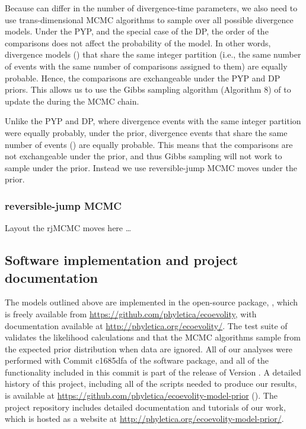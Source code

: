 \documentclass[letterpaper,12pt]{article}
\begin{document}
Because \etimesets can differ in the number of divergence-time parameters, we
also need to use trans-dimensional MCMC algorithms to sample over all possible
divergence models.
Under the PYP, and the special case of the DP, the order of the comparisons
does not affect the probability of the model.
In other words, divergence models (\etimesets) that share the same integer
partition (i.e., the same number of events with the same number of comparisons
assigned to them) are equally probable.
Hence, the comparisons are exchangeable under the PYP and DP priors.
This allows us to use the Gibbs sampling algorithm (Algorithm 8) of
\citet{Neal2000} to update the \etimesets during the MCMC chain.

Unlike the PYP and DP, where divergence events with the same
integer partition were equally probably, under the
\wunif prior, divergence events that share the same number of events (\nevents) are
equally probable.
This means that the comparisons are not exchangeable under the \wunif prior,
and thus Gibbs sampling will not work to sample \etimesets under the \wunif
prior.
Instead we use reversible-jump MCMC moves under the \wunif prior.

\subsubsection{reversible-jump MCMC}
Layout the rjMCMC moves here \ldots


\subsection{Software implementation and project documentation}

The models outlined above are implemented in the open-source \cpp package,
\ecoevolity, which is freely available from
\url{https://github.com/phyletica/ecoevolity}, with documentation available
at
\url{http://phyletica.org/ecoevolity/}.
The test suite of \ecoevolity
validates the likelihood calculations and that the MCMC algorithms sample from
the expected prior distribution when data are ignored.
All of our analyses were performed with
Commit c1685dfa
of the \ecoevolity software package,
and all of the functionality included in this commit is part of
the release of Version .
A detailed history of this project, including all of the scripts
needed to produce our results, is available at
\url{https://github.com/phyletica/ecoevolity-model-prior}
().
The project repository includes detailed documentation and tutorials of our
work, which is hosted as a website at
\url{http://phyletica.org/ecoevolity-model-prior/}.
\end{document}
